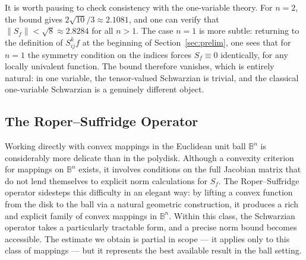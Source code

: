 \documentclass[12pt]{amsart}
\theoremstyle{definition}
\theoremstyle{remark}
\numberwithin{equation}{section}
\begin{document}
It is worth pausing to check consistency with the one-variable theory. For
$n=2$, the bound gives $2\sqrt{10}/3\approx 2.1081$, and one can verify that
$\|S_f\|<\sqrt{8}\approx 2.8284$ for all $n>1$. The case $n=1$ is more
subtle: returning to the definition of $S^k_{ij}f$ at the beginning of
Section~\ref{sec:prelim}, one sees that for $n=1$ the symmetry condition on
the indices forces $S_f\equiv 0$ identically, for any locally univalent
function. The bound therefore vanishes, which is entirely natural: in one
variable, the tensor-valued Schwarzian is trivial, and the classical
one-variable Schwarzian is a genuinely different object.

\subsection{The Roper--Suffridge Operator}

Working directly with convex mappings in the Euclidean unit ball $\mathbb{B}^n$
is considerably more delicate than in the polydisk. Although a convexity
criterion for mappings on $\mathbb{B}^n$ exists, it involves conditions on the
full Jacobian matrix that do not lend themselves to explicit norm calculations
for $S_f$. The Roper--Suffridge operator sidesteps this difficulty in an
elegant way: by lifting a convex function from the disk to the ball via a
natural geometric construction, it produces a rich and explicit family of
convex mappings in $\mathbb{B}^n$. Within this class, the Schwarzian operator
takes a particularly tractable form, and a precise norm bound becomes
accessible. The estimate we obtain is partial in scope --- it applies only to
this class of mappings --- but it represents the best available result in the
ball setting.
\end{document}
